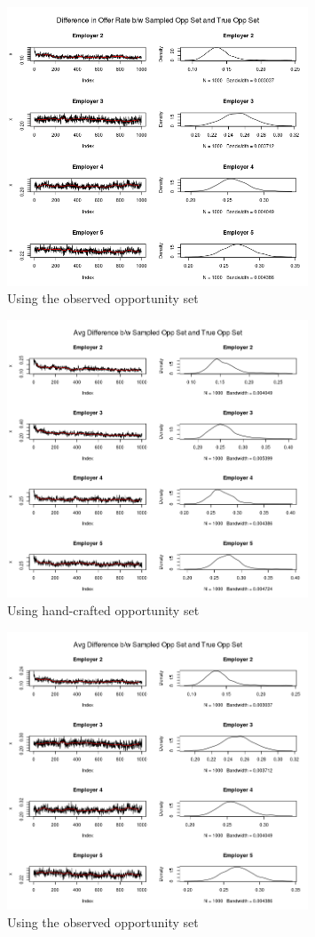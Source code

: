 \documentclass[12pt]{article}
\begin{document}
\begin{figure}[!ht]
\centering
\includegraphics[width=0.8\textwidth]{../figure/diff_offer_rate_opp_obs_opp}
\caption{Using the observed opportunity set}
\end{figure}

\begin{figure}[!ht]
\centering
\includegraphics[width=0.8\textwidth]{../figure/avg_diff_opp_starting_opp}
\caption{Using hand-crafted opportunity set}
\end{figure}

\begin{figure}[!ht]
\centering
\includegraphics[width=0.8\textwidth]{../figure/avg_diff_opp_obs_opp}
\caption{Using the observed opportunity set}
\end{figure}

\clearpage


\end{document}
